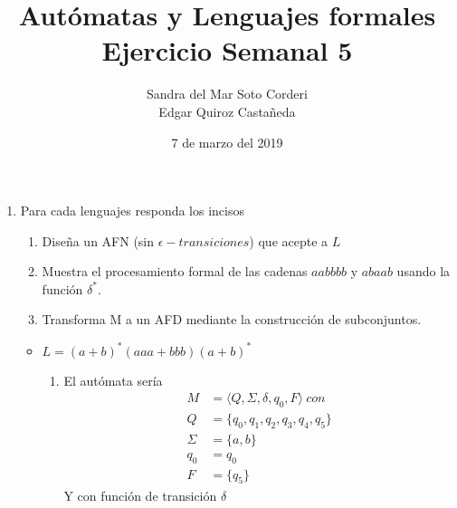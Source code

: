 \documentclass{article}
\begin{document}
    \title{
        Autómatas y Lenguajes formales \\
        Ejercicio Semanal 5
    }

    \author{
        Sandra del Mar Soto Corderi \\
        Edgar Quiroz Castañeda
    }

    \date{
        7 de marzo del 2019
    }
    
    \maketitle

    \begin{enumerate}
        \item {
            Para cada lenguajes responda los incisos
            \begin{enumerate}
                \item Diseña un AFN (sin $\epsilon-transiciones$) que acepte a 
                $L$
                \item Muestra el procesamiento formal de las cadenas $aabbbb$ y 
                $abaab$ usando la función $\delta^{*}$.
                \item Transforma M a un AFD mediante la construcción de 
                subconjuntos.\\
            \end{enumerate}
            \begin{itemize}
                \item $L = (a + b)^{*}(aaa + bbb)(a + b)^{*}$
                \begin{enumerate}
                    \item {
                        El autómata sería
                        \begin{align*}
                            M &= \langle Q, \Sigma, \delta, q_{0}, F \rangle \ con\\
                            Q &= \{q_{0}, q_{1}, q_{2}, q_{3}, q_{4}, q_{5}\} \\
                            \Sigma &= \{a, b\} \\
                            q_{0} &= q_{0} \\
                            F &= \{q_{5}\}
                        \end{align*}
                        Y con función de transición $\delta$
                        
}
\end{enumerate}
\end{itemize}}
\end{enumerate}
\end{document}
